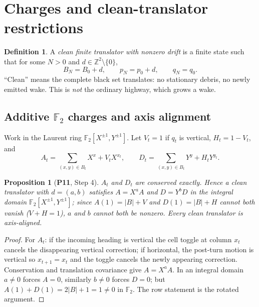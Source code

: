 \documentclass[11pt,reqno]{amsart}
\theoremstyle{plain}
\newtheorem{proposition}[theorem]{Proposition}
\theoremstyle{definition}
\newtheorem{definition}[theorem]{Definition}
\newcommand{\Z}{\mathbb{Z}}
\newcommand{\F}{\mathbb{F}}
\newcommand{\drift}{d}
\newcommand{\PN}[1]{\textbf{P#1}}
\begin{document}
\section{Charges and clean-translator restrictions}\label{sec:charges}

\begin{definition}\label{def:translator}
A \emph{clean finite translator with nonzero drift} is a finite state such that
for some $N>0$ and $\drift\in\Z^2\setminus\{0\}$,
\[
B_N=B_0+\drift,\qquad p_N=p_0+\drift,\qquad q_N=q_0.
\]
``Clean'' means the complete black set translates: no stationary debris, no
newly emitted wake. This is \emph{not} the ordinary highway, which grows a wake.
\end{definition}

\subsection{Additive \texorpdfstring{$\F_2$}{F2} charges and axis alignment}
Work in the Laurent ring $\F_2[X^{\pm1},Y^{\pm1}]$. Let $V_t=1$ if $q_t$ is
vertical, $H_t=1-V_t$, and
\[
A_t=\sum_{(x,y)\in B_t}X^x+V_tX^{x_t},\qquad
D_t=\sum_{(x,y)\in B_t}Y^y+H_tY^{y_t}.
\]

\begin{proposition}[\PN{11}, Step 4]\label{prop:laurent}
$A_t$ and $D_t$ are conserved exactly. Hence a clean translator with
$\drift=(a,b)$ satisfies $A=X^aA$ and $D=Y^bD$ in the integral domain
$\F_2[X^{\pm1},Y^{\pm1}]$; since $A(1)=|B|+V$ and $D(1)=|B|+H$ cannot both vanish
($V+H=1$), $a$ and $b$ cannot both be nonzero. Every clean translator is
axis-aligned.
\end{proposition}

\begin{proof}
For $A_t$: if the incoming heading is vertical the cell toggle at column $x_t$
cancels the disappearing vertical correction; if horizontal, the post-turn
motion is vertical so $x_{t+1}=x_t$ and the toggle cancels the newly appearing
correction. Conservation and translation covariance give $A=X^aA$. In an
integral domain $a\neq0$ forces $A=0$, similarly $b\neq0$ forces $D=0$; but
$A(1)+D(1)=2|B|+1=1\neq0$ in $\F_2$. The row statement is the rotated argument.
\end{proof}
\end{document}
